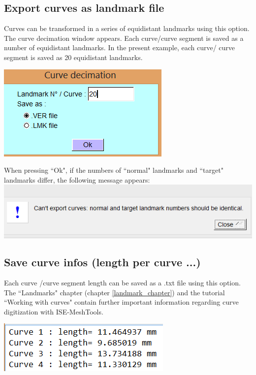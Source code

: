 \subsection{Export curves as landmark file}
\begin{minipage}{0.55\textwidth}

Curves can be transformed in a series of equidistant
landmarks using this option. The curve decimation window
appears.
Each curve/curve segment is saved as a number of
equidistant landmarks. In the present example, each curve/
curve segment is saved as 20 equidistant landmarks.

\end{minipage}  
 \begin{minipage}{0.45\textwidth}\centering
  \includegraphics[scale=0.5]{images/Landmarks/Export_curves.png}
 \end{minipage} 

When pressing ``Ok", if the numbers of ``normal" landmarks and ``target" landmarks differ, the
following message appears:\\
\includegraphics[scale=0.5]{images/Landmarks/Can_not_export.png}

\subsection{Save curve infos (length per curve ...)}
\begin{minipage}{0.55\textwidth}

Each curve /curve segment length can be saved as a .txt file
using this option.
The ``Landmarks" chapter (chapter \ref{landmark_chapter}) and the
tutorial ``Working with curves" contain further important
information regarding curve digitization with ISE-MeshTools.

\end{minipage}  
 \begin{minipage}{0.45\textwidth}\centering
  \includegraphics[scale=0.5]{images/Landmarks/Curve_infos.png}
 \end{minipage} 




